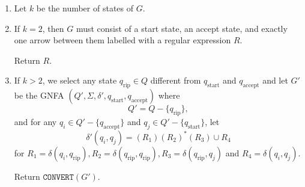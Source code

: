 \begin{enumerate}
	\item Let $k$ be the number of states of $G$.
	
	\item If $k=2$, then $G$ must consist of a start state, an accept state, and exactly one arrow between them labelled with a regular expression $R$.
	
	Return $R.$
	
	\item If $k>2$, we select any state $q_{\text{rip}}\in Q$ different from $q_{\text{start}}$ and $q_{\text{accept}}$ and let $G'$ be the GNFA $(Q',\Sigma,\delta',q_{\text{start}},q_{\text{accept}})$ where
	$$Q'=Q-\{q_{\text{rip}}\},$$
	and for any $q_i\in Q'-\{q_{\text{accept}}\}$ and $q_j\in Q'-\{q_{\text{start}}\}$, let
	$$\delta'(q_i,q_j)=(R_1)(R_2)^*(R_3)\cup R_4$$
	for $R_1=\delta(q_i,q_\text{rip}), R_2=\delta(q_\text{rip}, q_\text{rip}), R_3=\delta(q_\text{rip},q_j)$ and $R_4=\delta(q_i,q_j)$.
	
	Return $\texttt{CONVERT}(G')$.  
\end{enumerate}


